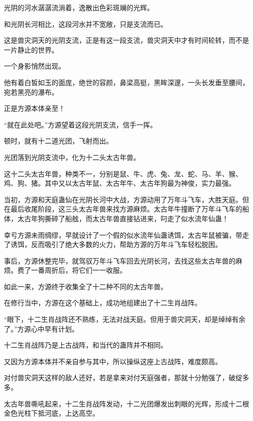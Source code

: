 
\begin{this_body}

光阴的河水潺潺流淌着，逸散出色彩斑斓的光辉。

和光阴长河相比，这段河水并不宽敞，只是支流而已。

这是兽灾洞天的光阴支流，正是有这一段支流，兽灾洞天中才有时间轮转，而不是一片静止的世界。

一个身影悄然出现。

他有着白皙如玉的面庞，绝世的容颜，鼻梁高挺，黑眸深邃，一头长发垂至腰间，宛若黑亮的瀑布。

正是方源本体亲至！

“就在此处吧。”方源望着这段光阴支流，信手一挥。

顿时，就有十二道光团，飞射而出。

光团落到光阴支流中，化为十二头太古年兽。

这十二头太古年兽，种类不一，分别是鼠、牛、虎、兔、龙、蛇、马、羊、猴、鸡、狗、猪。其中又以太古年鼠、太古年牛、太古年狗最为神俊，实力最强。

当初，方源和天庭蛊仙在光阴长河中大战，方源动用了万年斗飞车，大胜天庭。但在最后收尾阶段，这三头太古年兽来找方源麻烦。太古年牛撞断了万年斗飞车的船体，太古年狗撕碎了船舷，而太古年兽直接钻进来，叼走了似水流年仙蛊！

幸亏方源未雨绸缪，早就设计了一个假的似水流年仙蛊诱饵，太古年鼠被骗，带走了诱饵，反而吸引了绝大多数的火力，帮助方源的万年斗飞车轻松脱困。

事后，方源休整完毕，就驾驭万年斗飞车回去光阴长河，去找这些太古年兽的麻烦。费了一番周折后，将它们一一收服。

如此一来，方源终于收集全了十二种不同的太古年兽。

在修行当中，方源在这个基础上，成功地组建出了十二生肖战阵。

“眼下，十二生肖战阵还不熟练，无法对战天庭。但用于兽灾洞天，却是绰绰有余了。”方源心中早有计划。

十二生肖战阵乃是上古战阵，和当代的蛊阵并不相同。

又因为方源本体并不亲自参与其中，所以操纵这座上古战阵，难度颇高。

对付兽灾洞天这样的敌人还好，若是拿来对付天庭强者，那就十分勉强了，破绽多多。

太古年兽嘶吼起来，十二生肖战阵发动，十二光团爆发出刺眼的光辉，形成十二根金色光柱下抵河底，上达高空。


\end{this_body}
